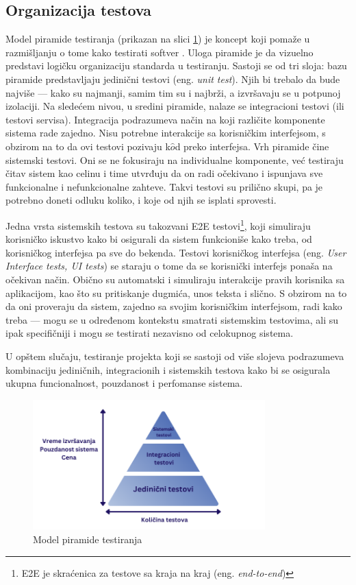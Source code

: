 \documentclass[12pt,oneside]{memoir}
\begin{document}
\subsection{Organizacija testova}
\par Model piramide testiranja (prikazan na slici \ref{fig:piramida}) je koncept koji pomaže u razmišljanju o tome kako testirati softver \cite{cohn}. Uloga piramide je da vizuelno predstavi logičku organizaciju standarda u testiranju. Sastoji se od tri sloja: bazu piramide predstavljaju jedinični testovi (eng. \emph{unit test}). Njih bi trebalo da bude najviše --- kako su najmanji, samim tim su i najbrži, a izvršavaju se u potpunoj izolaciji. Na sledećem nivou, u sredini piramide, nalaze se integracioni testovi (ili testovi servisa). Integracija podrazumeva način na koji različite komponente sistema rade zajedno. Nisu potrebne interakcije sa korisničkim interfejsom, s obzirom na to da ovi testovi pozivaju k$\hat{o}$d preko interfejsa. Vrh piramide čine sistemski testovi. Oni se ne fokusiraju na individualne komponente, već testiraju čitav sistem kao celinu i time utvrđuju da on radi očekivano i ispunjava sve funkcionalne i nefunkcionalne zahteve. Takvi testovi su prilično skupi, pa je potrebno doneti odluku koliko, i koje od njih se isplati sprovesti.
\par Jedna vrsta sistemskih testova su takozvani E2E testovi\footnote{E2E je skraćenica za testove sa kraja na kraj (eng. \emph{end-to-end})}, koji simuliraju korisničko iskustvo kako bi osigurali da sistem funkcioniše kako treba, od korisničkog interfejsa pa sve do bekenda. Testovi korisničkog interfejsa (eng. \emph{User Interface tests, UI tests}) se staraju o tome da se korisnički interfejs ponaša na očekivan način. Obično su automatski i simuliraju interakcije pravih korisnika sa aplikacijom, kao što su pritiskanje dugmića, unos teksta i slično. S obzirom na to da oni proveraju da sistem, zajedno sa svojim korisničkim interfejsom, radi kako treba --- mogu se u određenom kontekstu smatrati sistemskim testovima, ali su ipak specifičniji i mogu se testirati nezavisno od celokupnog sistema. 
\par U opštem slučaju, testiranje projekta koji se sastoji od više slojeva podrazumeva kombinaciju jediničnih, integracionih i sistemskih testova kako bi se osigurala ukupna funcionalnost, pouzdanost i perfomanse sistema.

\begin{figure}[!ht]
  \centering
  \label{fig:piramida}
  \includegraphics[width=0.8\textwidth]{piramidanova.png}
  \caption{Model piramide testiranja}
\end{figure}
\end{document}
